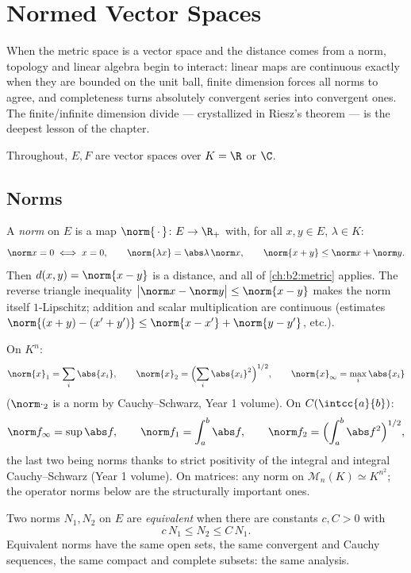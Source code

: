 \chapter{Normed Vector Spaces}\label{ch:b2:nvs}

When the metric space is a vector space and the distance comes from
a norm, topology and linear algebra begin to interact: linear maps
are continuous exactly when they are bounded on the unit ball,
finite dimension forces all norms to agree, and completeness turns
absolutely convergent series into convergent ones. The
finite/infinite dimension divide --- crystallized in Riesz's theorem
--- is the deepest lesson of the chapter.

Throughout, $E, F$ are vector spaces over $K = \R$ or $\C$.

\section{Norms}

\begin{definition}\label{def:b2:nvs:norm}
A \emph{norm} on $E$ is a map $\norm{\,\cdot\,} \colon E
\to \R_+$ with, for all $x, y \in E$, $\lambda \in K$:
\[
\norm x = 0 \iff x = 0,
\qquad
\norm{\lambda x} = \abs\lambda\,\norm x,
\qquad
\norm{x + y} \leq \norm x + \norm y .
\]
Then $d(x, y) = \norm{x - y}$ is a distance, and all of
\cref{ch:b2:metric} applies. The reverse triangle inequality
$\bigl|\norm x - \norm y\bigr| \leq \norm{x - y}$ makes the norm
itself $1$-Lipschitz; addition and scalar multiplication are
continuous (estimates $\norm{(x + y) - (x' + y')} \leq \norm{x -
x'} + \norm{y - y'}$, etc.).
\end{definition}

\begin{example}\label{ex:b2:nvs:examples}
On $K^n$:
\[
\norm{x}_1 = \sum_i \abs{x_i},
\qquad
\norm{x}_2 = \Bigl(\sum_i \abs{x_i}^2\Bigr)^{1/2},
\qquad
\norm{x}_\infty = \max_i \abs{x_i}
\]
($\norm\cdot_2$ is a norm by Cauchy--Schwarz, Year 1 volume). On
$C(\intcc{a}{b})$:
\[
\norm f_\infty = \sup \abs f,
\qquad
\norm f_1 = \int_a^b \abs f,
\qquad
\norm f_2 = \Bigl(\int_a^b \abs f^2\Bigr)^{1/2},
\]
the last two being norms thanks to strict positivity of the
integral and integral Cauchy--Schwarz (Year 1 volume). On matrices:
any norm on $\mathcal M_n(K) \simeq K^{n^2}$; the operator norms
below are the structurally important ones.
\end{example}

\begin{definition}\label{def:b2:nvs:equivalent}
Two norms $N_1, N_2$ on $E$ are \emph{equivalent} when there are constants $c, C > 0$ with
\[
c\,N_1 \leq N_2 \leq C\, N_1 .
\]
Equivalent norms have the same open sets, the same convergent and
Cauchy sequences, the same compact and complete subsets: the same
analysis.
\end{definition}

